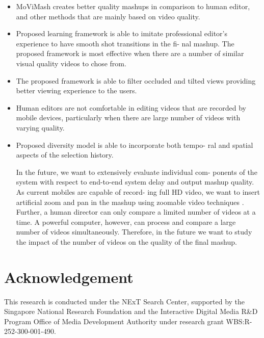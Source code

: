 \documentclass{new}
\begin{document}
\begin{itemize}
\item MoViMash creates better quality mashups in comparison to
human editor, and other methods that are mainly based on
video quality.

\item Proposed learning framework is able to imitate professional
editor's experience to have smooth shot transitions in the fi-
nal mashup. The proposed framework is most effective when there are a number of similar visual quality videos to chose
from.

\item The proposed framework is able to filter occluded and tilted
views providing better viewing experience to the users.

\item Human editors are not comfortable in editing videos that are
recorded by mobile devices, particularly when there are large
number of videos with varying quality.
\item Proposed diversity model is able to incorporate both tempo-
ral and spatial aspects of the selection history.

In the future, we want to extensively evaluate individual com-
ponents of the system with respect to end-to-end system delay and
output mashup quality. As current mobiles are capable of record-
ing full HD video, we want to insert artificial zoom and pan in the
mashup using zoomable video techniques \cite{11}. Further, a human
director can only compare a limited number of videos at a time.
A powerful computer, however, can process and compare a large
number of videos simultaneously. Therefore, in the future we want
to study the impact of the number of videos on the quality of the
final mashup.
\end{itemize}

\section*{Acknowledgement}
This research is conducted under the NExT Search Center, supported by the Singapore National Research Foundation and the Interactive Digital Media R\&D Program Office of Media Development Authority under research grant WBS:R-252-300-001-490.





\end{document}
